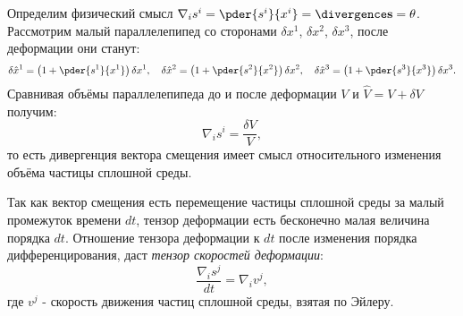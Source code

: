 Определим физический смысл \( \nabla_is^i = \pder{s^i}{x^i} = \divergence\vec{s} =
\theta \). Рассмотрим малый параллелепипед со сторонами \( \delta x^1 \),
\( \delta x^2 \), \( \delta x^3 \), после деформации они станут:
\[
	\delta\hat{x}^1 = \left(1 + \pder{s^1}{x^1}\right)\delta x^1,\quad
	\delta\hat{x}^2 = \left(1 + \pder{s^2}{x^2}\right)\delta x^2,\quad
	\delta\hat{x}^3 = \left(1 + \pder{s^3}{x^3}\right)\delta x^3.
\]
Сравнивая объёмы параллелепипеда до и после деформации \( V \) и
\( \hat{V} = V + \delta V \) получим:
\[
	\nabla_is^i = \frac{\delta V}{V},
\]
то есть дивергенция вектора смещения имеет смысл относительного изменения
объёма частицы сплошной среды.

Так как вектор смещения есть перемещение частицы сплошной среды за малый
промежуток времени \( dt \), тензор деформации есть бесконечно малая величина
порядка \( dt \). Отношение тензора деформации к \( dt \) после изменения
порядка дифференцирования, даст \emph{тензор скоростей деформации}:
\[
	\frac{\nabla_is^j}{dt} = \nabla_iv^j,
\]
где \( v^j \) - скорость движения частиц сплошной среды, взятая по Эйлеру.
\newpage
